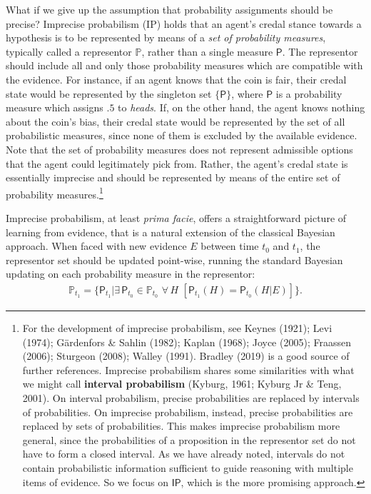 \documentclass[
  10pt,
  dvipsnames,enabledeprecatedfontcommands]{scrartcl}
\newcommand{\s}[1]{\mbox{$\mathsf{#1}$}}
\begin{document}
What if we give up the assumption that probability assignments should be
precise? Imprecise probabilism (\textsf{IP}) holds that an agent's
credal stance towards a hypothesis is to be represented by means of a
\emph{set of probability measures}, typically called a representor
\(\mathbb{P}\), rather than a single measure \(\mathsf{P}\). The
representor should include all and only those probability measures which
are compatible with the evidence. For instance, if an agent knows that
the coin is fair, their credal state would be represented by the
singleton set \(\{\mathsf{P}\}\), where \(\mathsf{P}\) is a probability
measure which assigns \(.5\) to \emph{heads}. If, on the other hand, the
agent knows nothing about the coin's bias, their credal state would be
represented by the set of all probabilistic measures, since none of them
is excluded by the available evidence. Note that the set of probability
measures does not represent admissible options that the agent could
legitimately pick from. Rather, the agent's credal state is essentially
imprecise and should be represented by means of the entire set of
probability measures.\footnote{For the development of imprecise
  probabilism, see Keynes (1921); Levi (1974); Gärdenfors \& Sahlin
  (1982); Kaplan (1968); Joyce (2005); Fraassen (2006); Sturgeon (2008);
  Walley (1991). Bradley (2019) is a good source of further references.
  Imprecise probabilism shares some similarities with what we might call
  \textbf{interval probabilism} (Kyburg, 1961; Kyburg Jr \& Teng, 2001).
  On interval probabilism, precise probabilities are replaced by
  intervals of probabilities. On imprecise probabilism, instead, precise
  probabilities are replaced by sets of probabilities. This makes
  imprecise probabilism more general, since the probabilities of a
  proposition in the representor set do not have to form a closed
  interval. As we have already noted, intervals do not contain
  probabilistic information sufficient to guide reasoning with multiple
  items of evidence. So we focus on \s{IP}, which is the more promising
  approach.}

Imprecise probabilism, at least \emph{prima facie}, offers a
straightforward picture of learning from evidence, that is a natural
extension of the classical Bayesian approach. When faced with new
evidence \(E\) between time \(t_0\) and \(t_1\), the representor set
should be updated point-wise, running the standard Bayesian updating on
each probability measure in the representor:
\begin{align*} \label{eq:updateRepresentor}
\mathbb{P}_{t_1} = \{\mathsf{P}_{t_1}\vert \exists\, {\mathsf{P}_{t_0} \!\in  \mathbb{P}_{t_0}}\,\, \forall\, {H}\,\, \left[\mathsf{P}_{t_1}(H)=\mathsf{P}_{t_0}(H \vert E)\right] \}.
\end{align*}
\end{document}
